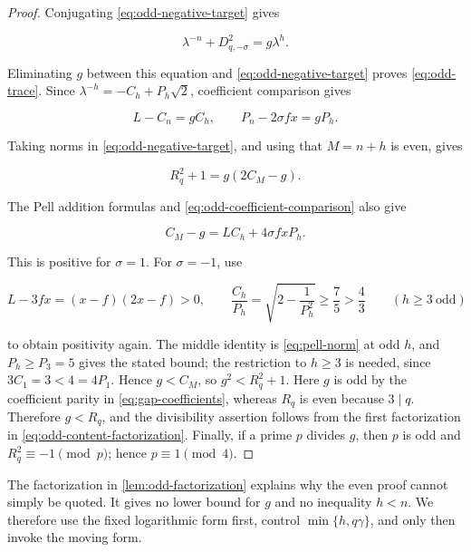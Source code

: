 \begin{proof}
Conjugating \cref{eq:odd-negative-target} gives

\begin{equation}
 \lambda^{-n}+D_{q,-\sigma}^2=g\lambda^h.
 \label{eq:odd-negative-conjugate}
\end{equation}

Eliminating $g$ between this equation and
\cref{eq:odd-negative-target} proves \cref{eq:odd-trace}. Since
$\lambda^{-h}=-C_h+P_h\sqrt2$, coefficient comparison gives

\begin{equation}
 L-C_n=gC_h,
 \qquad
 P_n-2\sigma fx=gP_h.
 \label{eq:odd-coefficient-comparison}
\end{equation}

Taking norms in \cref{eq:odd-negative-target}, and using that $M=n+h$ is
even, gives

\begin{equation}
 R_q^2+1=g(2C_M-g).
\end{equation}

The Pell addition formulas and \cref{eq:odd-coefficient-comparison} also
give

\begin{equation}
 C_M-g=LC_h+4\sigma fxP_h.
 \label{eq:odd-positive-factor}
\end{equation}

This is positive for $\sigma=1$. For $\sigma=-1$, use

\begin{equation}
 L-3fx=(x-f)(2x-f)>0,
 \qquad
 \frac{C_h}{P_h}=\sqrt{2-\frac1{P_h^2}}\geqslant\frac75>\frac43
 \qquad(h\geqslant3\ \text{odd})
\end{equation}

to obtain positivity again. The middle identity is
\cref{eq:pell-norm} at odd $h$, and $P_h\geqslant P_3=5$ gives the stated
bound; the restriction to $h\geqslant3$ is needed, since $3C_1=3<4=4P_1$. Hence $g<C_M$, so
$g^2<R_q^2+1$. Here $g$ is odd by the coefficient parity in
\cref{eq:gap-coefficients}, whereas $R_q$ is even because $3\mid q$.
Therefore $g<R_q$, and the divisibility assertion follows from the first
factorization in \cref{eq:odd-content-factorization}. Finally, if a prime
$p$ divides $g$, then $p$ is odd and $R_q^2\equiv-1\pmod p$; hence
$p\equiv1\pmod4$.
\end{proof}

The factorization in \cref{lem:odd-factorization} explains why the even
proof cannot simply be quoted. It gives no lower bound for $g$ and no
inequality $h<n$. We therefore use the fixed logarithmic form first, control
$\min\{h,q\gamma\}$, and only then invoke the moving form.

